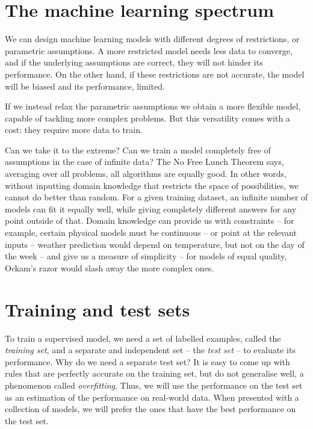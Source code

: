 \section{The machine learning spectrum}
We can design machine learning models with different degrees of restrictions, or parametric assumptions.
A more restricted model needs less data to converge, and if the underlying assumptions are correct, they will not hinder its performance.
On the other hand, if these restrictions are not accurate, the model will be biased and its performance, limited.

If we instead relax the parametric assumptions we obtain a more flexible model, capable of tackling more complex problems.
But this versatility comes with a cost: they require more data to train.

Can we take it to the extreme?
Can we train a model completely free  of assumptions in the case of infinite data? The No Free Lunch Theorem \citep{no_free_lunch} says, averaging over all problems, all algorithms are equally good.
In other words, without inputting domain knowledge that restricts the space of possibilities, we cannot do better than random.
For a given training dataset, an infinite number of models can fit it equally well, while giving completely different answers for any point outside of that.
Domain knowledge can provide us with constraints -- for example, certain physical models must be continuous -- or point at the relevant inputs -- weather prediction would depend on temperature, but not on the day of the week -- and give us a measure of simplicity -- for models of equal quality, Ockam's razor would slash away the more complex ones.

\section{Training and test sets}
To train a supervised model, we need a set of labelled examples, called the \emph{training set},
and a separate and independent set -- the \emph{test set} -- to evaluate its performance.
Why do we need a separate test set?
It is easy to come up with rules that are perfectly accurate on the training set, but do not generalise well, a phenomenon called \emph{overfitting}.
Thus, we will use the performance on the test set as an estimation of the performance on real-world data. 
When presented with a collection of models, we will prefer the ones that have the best performance on the test set.

